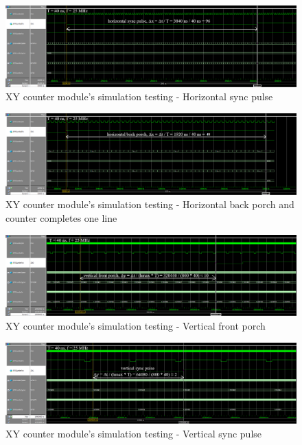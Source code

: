 \documentclass[12pt]{article}
\numberwithin{figure}{subsection}
\begin{document}
\begin{figure}[ht]
  \centering
  \includegraphics[width=\textwidth]{xycounter_simulation_horizontal_sync_pulse.png}
  \caption{XY counter module’s simulation testing - Horizontal sync pulse}
  \label{fig:xycounter_simulation_horizontal_sync_pulse}
\end{figure}

\begin{figure}[ht!]
  \centering
  \includegraphics[width=\textwidth]{xycounter_simulation_horizontal_back_porch.png}
  \caption{XY counter module’s simulation testing - Horizontal back porch and counter completes one line}
  \label{fig:xycounter_simulation_horizontal_back_porch}
\end{figure}

\newpage

\begin{figure}[ht]
  \centering
  \includegraphics[width=\textwidth]{xycounter_simulation_vertical_front_porch.png}
  \caption{XY counter module’s simulation testing - Vertical front porch}
  \label{fig:xycounter_simulation_vertical_front_porch}
\end{figure}

\begin{figure}[ht]
  \centering
  \includegraphics[width=\textwidth]{xycounter_simulation_vertical_sync_pulse.png}
  \caption{XY counter module’s simulation testing - Vertical sync pulse}
  \label{fig:xycounter_simulation_vertical_sync_pulse}
\end{figure}
\end{document}
